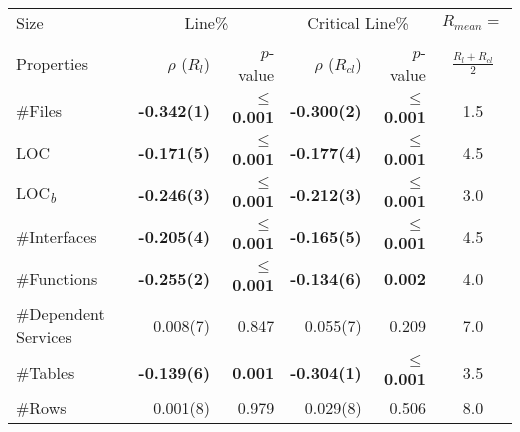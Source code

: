 \begin{tabular}{ l rrrr c}\\ 
\toprule 
Size & \multicolumn{2}{c}{Line\%} & \multicolumn{2}{c}{Critical Line\%}  & $R_{mean}=$\\ 
Properties & $\rho$ ($R_l$) &  $p$-value  & $\rho$ ($R_{cl}$) & $p$-value  & $\frac{R_l + R_{cl}}{2}$\\ 
\midrule 
\#Files & \textbf{-0.342(1)} & \textbf{$\le $0.001} & \textbf{-0.300(2)} & \textbf{$\le $0.001} & 1.5\\ 
LOC & \textbf{-0.171(5)} & \textbf{$\le $0.001} & \textbf{-0.177(4)} & \textbf{$\le $0.001} & 4.5\\ 
LOC\textsubscript{\emph{b}} & \textbf{-0.246(3)} & \textbf{$\le $0.001} & \textbf{-0.212(3)} & \textbf{$\le $0.001} & 3.0\\ 
\#Interfaces & \textbf{-0.205(4)} & \textbf{$\le $0.001} & \textbf{-0.165(5)} & \textbf{$\le $0.001} & 4.5\\ 
\#Functions & \textbf{-0.255(2)} & \textbf{$\le $0.001} & \textbf{-0.134(6)} & \textbf{0.002} & 4.0\\ 
\#Dependent Services & 0.008(7) & 0.847 & 0.055(7) & 0.209 & 7.0\\ 
\#Tables & \textbf{-0.139(6)} & \textbf{0.001} & \textbf{-0.304(1)} & \textbf{$\le $0.001} & 3.5\\ 
\#Rows & 0.001(8) & 0.979 & 0.029(8) & 0.506 & 8.0\\ 
\bottomrule 
\end{tabular} 
